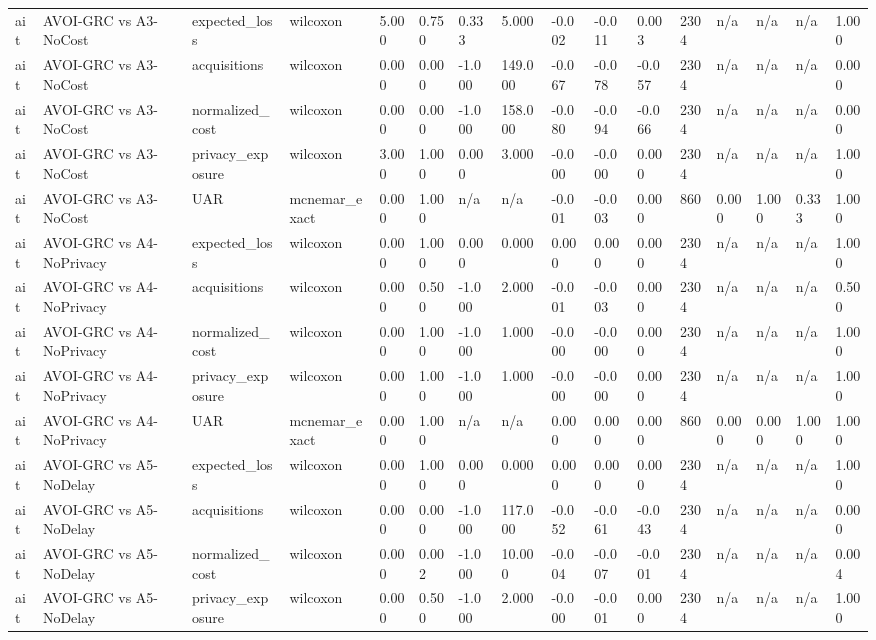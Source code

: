 \begin{table}[!ht]
{\begin{tabular}{llllllllllllllll}
ait & AVOI-GRC vs A3-NoCost & expected\_loss & wilcoxon & 5.000 & 0.750 & 0.333 & 5.000 & -0.002 & -0.011 & 0.003 & 2304 & n/a & n/a & n/a & 1.000 \\
ait & AVOI-GRC vs A3-NoCost & acquisitions & wilcoxon & 0.000 & 0.000 & -1.000 & 149.000 & -0.067 & -0.078 & -0.057 & 2304 & n/a & n/a & n/a & 0.000 \\
ait & AVOI-GRC vs A3-NoCost & normalized\_cost & wilcoxon & 0.000 & 0.000 & -1.000 & 158.000 & -0.080 & -0.094 & -0.066 & 2304 & n/a & n/a & n/a & 0.000 \\
ait & AVOI-GRC vs A3-NoCost & privacy\_exposure & wilcoxon & 3.000 & 1.000 & 0.000 & 3.000 & -0.000 & -0.000 & 0.000 & 2304 & n/a & n/a & n/a & 1.000 \\
ait & AVOI-GRC vs A3-NoCost & UAR & mcnemar\_exact & 0.000 & 1.000 & n/a & n/a & -0.001 & -0.003 & 0.000 & 860 & 0.000 & 1.000 & 0.333 & 1.000 \\
ait & AVOI-GRC vs A4-NoPrivacy & expected\_loss & wilcoxon & 0.000 & 1.000 & 0.000 & 0.000 & 0.000 & 0.000 & 0.000 & 2304 & n/a & n/a & n/a & 1.000 \\
ait & AVOI-GRC vs A4-NoPrivacy & acquisitions & wilcoxon & 0.000 & 0.500 & -1.000 & 2.000 & -0.001 & -0.003 & 0.000 & 2304 & n/a & n/a & n/a & 0.500 \\
ait & AVOI-GRC vs A4-NoPrivacy & normalized\_cost & wilcoxon & 0.000 & 1.000 & -1.000 & 1.000 & -0.000 & -0.000 & 0.000 & 2304 & n/a & n/a & n/a & 1.000 \\
ait & AVOI-GRC vs A4-NoPrivacy & privacy\_exposure & wilcoxon & 0.000 & 1.000 & -1.000 & 1.000 & -0.000 & -0.000 & 0.000 & 2304 & n/a & n/a & n/a & 1.000 \\
ait & AVOI-GRC vs A4-NoPrivacy & UAR & mcnemar\_exact & 0.000 & 1.000 & n/a & n/a & 0.000 & 0.000 & 0.000 & 860 & 0.000 & 0.000 & 1.000 & 1.000 \\
ait & AVOI-GRC vs A5-NoDelay & expected\_loss & wilcoxon & 0.000 & 1.000 & 0.000 & 0.000 & 0.000 & 0.000 & 0.000 & 2304 & n/a & n/a & n/a & 1.000 \\
ait & AVOI-GRC vs A5-NoDelay & acquisitions & wilcoxon & 0.000 & 0.000 & -1.000 & 117.000 & -0.052 & -0.061 & -0.043 & 2304 & n/a & n/a & n/a & 0.000 \\
ait & AVOI-GRC vs A5-NoDelay & normalized\_cost & wilcoxon & 0.000 & 0.002 & -1.000 & 10.000 & -0.004 & -0.007 & -0.001 & 2304 & n/a & n/a & n/a & 0.004 \\
ait & AVOI-GRC vs A5-NoDelay & privacy\_exposure & wilcoxon & 0.000 & 0.500 & -1.000 & 2.000 & -0.000 & -0.001 & 0.000 & 2304 & n/a & n/a & n/a & 1.000 \\

\end{tabular}}
\end{table}

